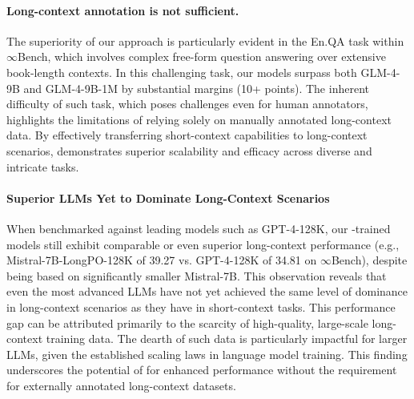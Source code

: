 \paragraph{Long-context annotation is not sufficient.} The superiority of our approach is particularly evident in the En.QA task within $\infty$Bench, which involves complex free-form question answering over extensive book-length contexts. In this challenging task, our models surpass both GLM-4-9B and GLM-4-9B-1M by substantial margins (10+ points). The inherent difficulty of such task, which poses challenges even for human annotators, highlights the limitations of relying solely on manually annotated long-context data. By effectively transferring short-context capabilities to long-context scenarios, \ourMethod{} demonstrates superior scalability and efficacy across diverse and intricate tasks.

\paragraph{Superior LLMs Yet to Dominate Long-Context Scenarios}

When benchmarked against leading models such as GPT-4-128K, our \ourMethod{}-trained models still exhibit comparable or even superior long-context performance (e.g., Mistral-7B-LongPO-128K of 39.27 vs. GPT-4-128K of 34.81 on $\infty$Bench), despite being based on significantly smaller Mistral-7B. This observation reveals that even the most advanced LLMs have not yet achieved the same level of dominance in long-context scenarios as they have in short-context tasks. This performance gap can be attributed primarily to the scarcity of high-quality, large-scale long-context training data. The dearth of such data is particularly impactful for larger LLMs, given the established scaling laws in language model training. This finding underscores the potential of \ourMethod{} for enhanced performance without the requirement for externally annotated long-context datasets.




